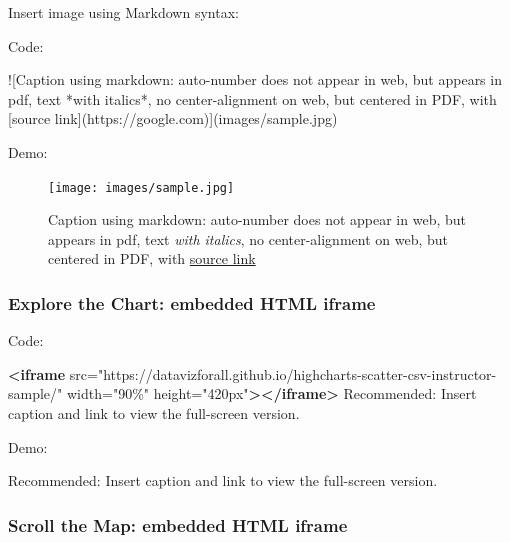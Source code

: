 \documentclass[
  english,
]{book}
\newenvironment{Shaded}{\begin{snugshade}}{\end{snugshade}}
\newcommand{\AlertTok}[1]{\textcolor[rgb]{0.94,0.16,0.16}{#1}}
\newcommand{\KeywordTok}[1]{\textcolor[rgb]{0.13,0.29,0.53}{\textbf{#1}}}
\newcommand{\NormalTok}[1]{#1}
\newcommand{\OtherTok}[1]{\textcolor[rgb]{0.56,0.35,0.01}{#1}}
\newcommand{\StringTok}[1]{\textcolor[rgb]{0.31,0.60,0.02}{#1}}
\begin{document}
Insert image using Markdown syntax:

Code:

\begin{Shaded}
\begin{Highlighting}[]
\AlertTok{![Caption using markdown: auto{-}number does not appear in web, but appears in pdf, text *with italics*, no center{-}alignment on web, but centered in PDF, with [source link](https://google.com)}\NormalTok{](images/sample.jpg)}
\end{Highlighting}
\end{Shaded}

Demo:

\begin{figure}
\centering
\texttt{[image: images/sample.jpg]}
\caption{Caption using markdown: auto-number does not appear in web, but appears in pdf, text \emph{with italics}, no center-alignment on web, but centered in PDF, with \href{https://google.com}{source link}}
\end{figure}

\hypertarget{explore-the-chart-embedded-html-iframe}{%
\subsubsection*{Explore the Chart: embedded HTML iframe}\label{explore-the-chart-embedded-html-iframe}}

Code:

\begin{Shaded}
\begin{Highlighting}[]
\KeywordTok{<iframe}\OtherTok{ src=}\StringTok{"https://datavizforall.github.io/highcharts{-}scatter{-}csv{-}instructor{-}sample/"}\OtherTok{ width=}\StringTok{"90\%"}\OtherTok{ height=}\StringTok{"420px"}\KeywordTok{></iframe>}
\NormalTok{Recommended: Insert caption and link to view the full{-}screen version.}
\end{Highlighting}
\end{Shaded}

Demo:

Recommended: Insert caption and link to view the full-screen version.

\hypertarget{scroll-the-map-embedded-html-iframe}{%
\subsubsection*{Scroll the Map: embedded HTML iframe}\label{scroll-the-map-embedded-html-iframe}}
\end{document}
